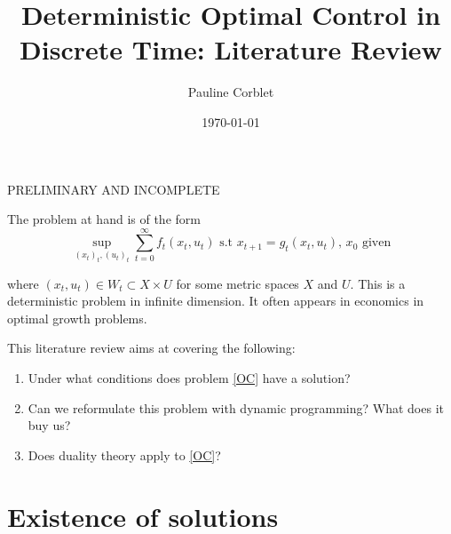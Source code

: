\documentclass[12pt]{article}
\title{Deterministic Optimal Control in Discrete Time: Literature Review}
\author{Pauline Corblet}
\date{\today}
\begin{document}
\maketitle

\begin{center}
  PRELIMINARY AND INCOMPLETE
\end{center}

The problem at hand is of the form
\begin{equation} \label{OC} \tag{OC}
  \sup_{(x_t)_t, (u_t)_t} \sum_{t=0}^{\infty} f_t(x_t, u_t) \text{ s.t } x_{t+1} = g_t(x_t,u_t), \, x_0 \text{ given}
\end{equation}

where $(x_t, u_t) \in W_t \subset X \times U$ for some metric spaces $X$ and $U$. This is a deterministic problem in infinite dimension. It often appears in economics in optimal growth problems.

\bigskip

This literature review aims at covering the following:
\begin{enumerate}
  \item \label{enum_sol} Under what conditions does problem \eqref{OC} have a solution?
  \item \label{enum_DP} Can we reformulate this problem with dynamic programming? What does it buy us?
  \item \label{enum_DT} Does duality theory apply to \eqref{OC}?
\end{enumerate}

\section{Existence of solutions}
\end{document}
